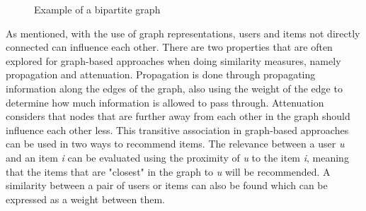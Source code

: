 \begin{figure}[h]
\caption{Example of a bipartite graph}
\label{fig:bipartite-graph}
\end{figure}

As mentioned, with the use of graph representations, users and items not directly connected can influence each other.
There are two properties that are often explored for graph-based approaches when doing similarity measures, namely propagation and attenuation.
Propagation is done through propagating information along the edges of the graph, also using the weight of the edge to determine how much information is allowed to pass through.
Attenuation considers that nodes that are further away from each other in the graph should influence each other less.
This transitive association in graph-based approaches can be used in two ways to recommend items.
The relevance between a user \textit{u} and an item \textit{i} can be evaluated using the proximity of \textit{u} to the item \textit{i}, meaning that the items that are "closest" in the graph to \textit{u} will be recommended.
A similarity between a pair of users or items can also be found which can be expressed as a weight between them\cite{RecommenderHandbook2015}.

